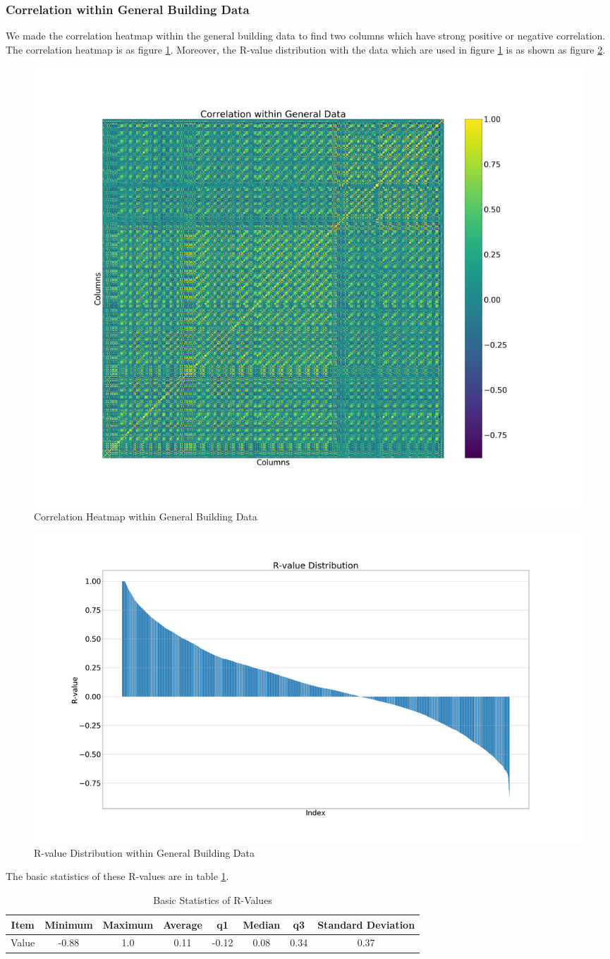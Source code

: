 \documentclass[aps, 10pt, a4paper]{article}
\begin{document}
            \subsubsection{Correlation within General Building Data} 
                We made the correlation heatmap within the general building data to find two columns which have strong positive or negative correlation. The correlation heatmap is as figure \ref{fig:correlationgeneral}. Moreover, the R-value distribution with the data which are used in figure \ref{fig:correlationgeneral} is as shown as figure \ref{fig:rgeneral}.
                
                \begin{figure}[htbp]
                    \centering
                    \includegraphics[width=0.4 \linewidth]{figures/correlationgeneral.png}
                    \caption{Correlation Heatmap within General Building Data}
                    \label{fig:correlationgeneral}
                \end{figure}
            
                \begin{figure}[htbp]
                    \centering
                    \includegraphics[width=0.5 \linewidth]{figures/rgeneral.png}
                    \caption{R-value Distribution within General Building Data}
                    \label{fig:rgeneral}
                \end{figure}
            
                The basic statistics of these R-values are in table \ref{tb:rgeneral}.
                
                \begin{table}[htbp]
                    \centering
                    \caption{Basic Statistics of R-Values}
                    \label{tb:rgeneral}
                    \begin{tabular}{c||c|c|c|c|c|c|c}
                        Item & Minimum & Maximum & Average & q1 & Median & q3 & Standard Deviation \\ \hline
                        Value & -0.88 & 1.0 & 0.11 & -0.12 & 0.08 & 0.34 & 0.37 \\
                    \end{tabular}
                \end{table}
            
\end{document}
